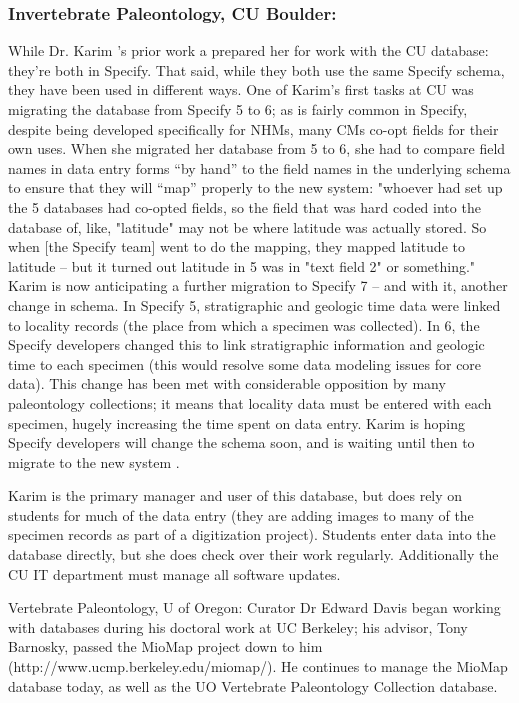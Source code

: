 \subsubsection{Invertebrate Paleontology, CU Boulder:}

While Dr. Karim ’s prior work a prepared her for work with the CU database: they’re both in Specify. That said, while they both use the same Specify schema, they have been used in different ways. One of Karim’s first tasks at CU was migrating the database from Specify 5 to 6; as is fairly common in Specify, despite being developed specifically for NHMs, many CMs co-opt fields for their own uses. When she migrated her database from 5 to 6, she had to compare field names in data entry forms “by hand” to the field names in the underlying schema to ensure that they will “map” properly to the new system: 
"whoever had set up the 5 databases had co-opted fields, so the field that was hard coded into the database of, like, "latitude" may not be where latitude was actually stored.  So when [the Specify team] went to do the mapping, they mapped latitude to latitude -- but it turned out latitude in 5 was in "text field 2" or something." 
Karim is now anticipating a further migration to Specify 7 – and with it, another change in schema. In Specify 5, stratigraphic and geologic time data were linked to locality records (the place from which a specimen was collected).  In 6, the Specify developers changed this to link stratigraphic information and geologic time to each specimen (this would resolve some data modeling issues for core data).  This change has been met with considerable opposition by many paleontology collections; it means that locality data must be entered with each specimen, hugely increasing the time spent on data entry. Karim is hoping Specify developers will change the schema soon, and is waiting until then to migrate to the new system .  

Karim is the primary manager and user of this database, but does rely on students for much of the data entry (they are adding images to many of the specimen records as part of a digitization project).  Students enter data into the database directly, but she does check over their work regularly. Additionally the CU IT department must manage all software updates.

Vertebrate Paleontology, U of Oregon: Curator Dr Edward Davis began working with databases during his doctoral work at UC Berkeley; his advisor, Tony Barnosky, passed the MioMap project down to him (http://www.ucmp.berkeley.edu/miomap/).  He continues to manage the MioMap database today, as well as the UO Vertebrate Paleontology Collection database.

